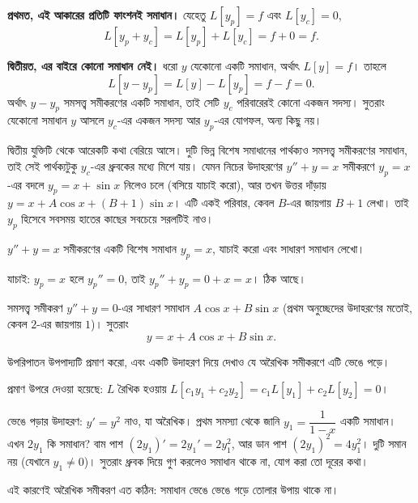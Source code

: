 \documentclass[11pt]{article}
\begin{document}
\textbf{প্রথমত, এই আকারের প্রতিটি ফাংশনই সমাধান।} যেহেতু $L[y_{p}] = f$ এবং
$L[y_{c}] = 0$,
\[
  L[y_{p} + y_{c}] = L[y_{p}] + L[y_{c}] = f + 0 = f .
\]

\textbf{দ্বিতীয়ত, এর বাইরে কোনো সমাধান নেই।} ধরো $y$ যেকোনো একটি সমাধান, অর্থাৎ
$L[y] = f$। তাহলে
\[
  L[y - y_{p}] = L[y] - L[y_{p}] = f - f = 0 .
\]
অর্থাৎ $y - y_{p}$ সমসত্ত্ব সমীকরণের একটি সমাধান, তাই সেটি $y_{c}$ পরিবারেরই
কোনো একজন সদস্য। সুতরাং যেকোনো সমাধান $y$ আসলে $y_{c}$-এর একজন
সদস্য আর $y_{p}$-এর যোগফল, অন্য কিছু নয়।

দ্বিতীয় যুক্তিটি থেকে আরেকটি কথা বেরিয়ে আসে। দুটি ভিন্ন বিশেষ সমাধানের
পার্থক্যও সমসত্ত্ব সমীকরণের সমাধান, তাই সেই পার্থক্যটুকু $y_{c}$-এর ধ্রুবকের
মধ্যে মিশে যায়। যেমন নিচের উদাহরণের $y'' + y = x$ সমীকরণে $y_{p} = x$-এর
বদলে $y_{p} = x + \sin x$ নিলেও চলে (বসিয়ে যাচাই করো), আর তখন উত্তর দাঁড়ায়
$y = x + A\cos x + (B+1)\sin x$। এটি একই পরিবার, কেবল $B$-এর জায়গায় $B+1$
লেখা। তাই $y_{p}$ হিসেবে সবসময় হাতের কাছের সবচেয়ে সরলটিই নাও।


\begin{example}
$y'' + y = x$ সমীকরণের একটি বিশেষ সমাধান $y_{p} = x$, যাচাই করো এবং সাধারণ
সমাধান লেখো।
\end{example}

\begin{solbox}
যাচাই: $y_{p} = x$ হলে $y_{p}'' = 0$, তাই $y_{p}'' + y_{p} = 0 + x = x$।
ঠিক আছে।

সমসত্ত্ব সমীকরণ $y'' + y = 0$-এর সাধারণ সমাধান $A\cos x + B\sin x$ (প্রথম
অনুচ্ছেদের উদাহরণের মতোই, কেবল $2$-এর জায়গায় $1$)। সুতরাং
\[
  y = x + A\cos x + B\sin x .
\]
\end{solbox}

 উপরিপাতন উপপাদ্যটি প্রমাণ করো, এবং একটি উদাহরণ দিয়ে দেখাও যে
অরৈখিক সমীকরণে এটি ভেঙে পড়ে।

\begin{sol}
প্রমাণ উপরে দেওয়া হয়েছে: $L$ রৈখিক হওয়ায়
$L[c_{1}y_{1}+c_{2}y_{2}] = c_{1}L[y_{1}] + c_{2}L[y_{2}] = 0$।

ভেঙে পড়ার উদাহরণ: $y' = y^{2}$ নাও, যা অরৈখিক। প্রথম সমস্যা থেকে জানি
$y_{1} = \dfrac{1}{1-x}$ একটি সমাধান। এখন $2y_{1}$ কি সমাধান? বাম পাশ
$(2y_{1})' = 2y_{1}' = 2y_{1}^{2}$, আর ডান পাশ $(2y_{1})^{2} = 4y_{1}^{2}$।
দুটি সমান নয় (যেখানে $y_{1} \neq 0$)। সুতরাং ধ্রুবক দিয়ে গুণ করলেও সমাধান
থাকে না, যোগ করা তো দূরের কথা।

এই কারণেই অরৈখিক সমীকরণ এত কঠিন: সমাধান ভেঙে ভেঙে গড়ে তোলার উপায় থাকে না।
\end{sol}
\end{document}
